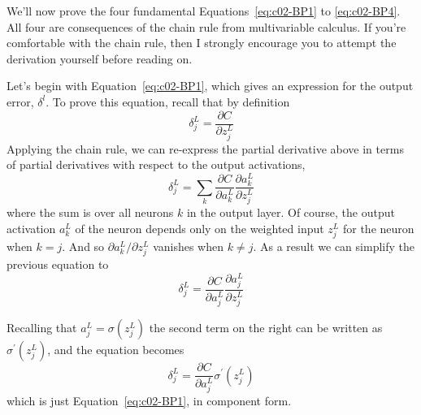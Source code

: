 We'll now prove the four fundamental  Equations~\ref{eq:c02-BP1} to \ref{eq:c02-BP4}. All four are consequences of the chain rule from multivariable calculus. If you're comfortable with the chain rule, then I strongly encourage you to attempt the derivation yourself before reading on.

Let's begin with Equation~\ref{eq:c02-BP1}, which gives an expression for the output error,  $\delta^{l}$. To prove this equation, recall that by definition
\begin{equation}
\delta_{j}^{L}=\frac{\partial C}{\partial z_{j}^{L}}
\label{eq:c02-36}
\end{equation}
Applying the chain rule, we can re-express the partial derivative above in terms of partial derivatives with respect to the output activations, 
\begin{equation}
\delta_{j}^{L}=\sum_{k} \frac{\partial C}{\partial a_{k}^{L}} \frac{\partial a_{k}^{L}}{\partial z_{j}^{L}}
\label{eq:c02-37}
\end{equation}
where the sum is over all neurons $k$ in the output layer. Of course, the output activation $a^L_k$ of the  neuron depends only on the weighted input $z_{j}^{L}$ for the  neuron when $k=j$. And so $\partial a_{k}^{L} / \partial z_{j}^{L}$ vanishes when $k\neq j$. As a result we can simplify the previous equation to 
\begin{equation}
\delta_{j}^{L}=\frac{\partial C}{\partial a_{j}^{L}} \frac{\partial a_{j}^{L}}{\partial z_{j}^{L}}
\label{eq:c02-38}
\end{equation}



Recalling that $a_{j}^{L}=\sigma\left(z_{j}^{L}\right)$ the second term on the right can be written as $\sigma^{\prime}\left(z_{j}^{L}\right)$, and the equation becomes 
\begin{equation}
\delta_{j}^{L}=\frac{\partial C}{\partial a_{j}^{L}} \sigma^{\prime}\left(z_{j}^{L}\right)
\label{eq:c02-39}
\end{equation}
which is just Equation~\ref{eq:c02-BP1}, in component form.

